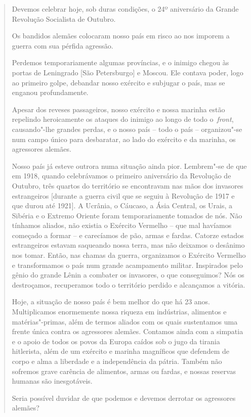 \begin{quote}
Devemos celebrar hoje, sob duras condições, o 24º aniversário da Grande
Revolução Socialista de Outubro.

Os bandidos alemães colocaram nosso país em risco ao nos imporem a
guerra com sua pérfida agressão.

Perdemos temporariamente algumas províncias, e o inimigo chegou às
portas de Leningrado {[}São Petersburgo{]} e Moscou. Ele contava poder,
logo ao primeiro golpe, debandar nosso exército e subjugar o país, mas
se enganou profundamente.

Apesar dos reveses passageiros, nosso exército e nossa marinha estão
repelindo heroicamente os ataques do inimigo ao longo de todo
o~\emph{front}, causando"-lhe grandes perdas, e o nosso país -- todo o
país -- organizou"-se num campo único para desbaratar, ao lado do exército
e da marinha, os agressores alemães.

Nosso país já esteve outrora numa situação ainda pior. Lembrem"-se de que
em 1918, quando celebrávamos o primeiro aniversário da Revolução de
Outubro, três quartos do território se encontravam nas mãos dos
invasores estrangeiros {[}durante a guerra civil que se seguiu à
Revolução de 1917 e que durou até 1921{]}. A Ucrânia, o Cáucaso, a Ásia
Central, os Urais, a Sibéria e o Extremo Oriente foram temporariamente
tomados de nós. Não tínhamos aliados, não existia o Exército Vermelho --
que mal havíamos começado a formar -- e carecíamos de pão, armas e
fardas. Catorze estados estrangeiros estavam saqueando nossa terra, mas
não deixamos o desânimo nos tomar. Então, nas chamas da guerra,
organizamos o Exército Vermelho e transformamos o país num grande
acampamento militar. Inspirados pelo gênio do grande Lênin a combater os
invasores, o que conseguimos? Nós os destroçamos, recuperamos todo o
território perdido e alcançamos a vitória.

Hoje, a situação de nosso país é bem melhor do que há 23 anos.
Multiplicamos enormemente nossa riqueza em indústrias, alimentos e
matérias"-primas, além de termos aliados com os quais sustentamos uma
frente única contra os agressores alemães. Contamos ainda com a simpatia
e o apoio de todos os povos da Europa caídos sob o jugo da tirania
hitlerista, além de um exército e marinha magníficos que defendem de
corpo e alma a liberdade e a independência da pátria. Também não
sofremos grave carência de alimentos, armas ou fardas, e nossas reservas
humanas são inesgotáveis.

Seria possível duvidar de que podemos e devemos derrotar os agressores
alemães?


\end{quote}
